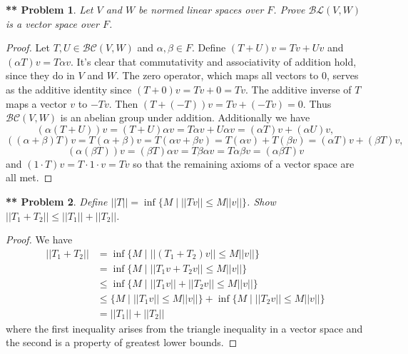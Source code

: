 \documentclass{article}
\newtheorem{**}{** Problem}
\begin{document}
\begin{flushleft}
\begin{**}
Let $V$ and $W$ be normed linear spaces over $F$. Prove $\mathcal{BL}(V, W)$ is a vector space over $F$.
\end{**}
\begin{proof}
Let $T, U \in \mathcal{BC} (V, W)$ and $\alpha, \beta \in F$. Define $(T + U)v = Tv + Uv$ and $(\alpha T)v = T\alpha v$. It's clear that commutativity and associativity of addition hold, since they do in $V$ and $W$. The zero operator, which maps all vectors to $0$, serves as the additive identity since $(T + 0)v = Tv + 0 = Tv$. The additive inverse of $T$ maps a vector $v$ to $-Tv$. Then $(T + (-T))v = Tv + (-Tv) = 0$. Thus $\mathcal{BC} (V, W)$ is an abelian group under addition. Additionally we have
\[
(\alpha(T + U))v = (T + U)\alpha v = T\alpha v + U\alpha v = (\alpha T)v + (\alpha U)v,
\]
\[
((\alpha + \beta)T)v = T(\alpha + \beta)v = T(\alpha v + \beta v) = T(\alpha v) + T(\beta v) = (\alpha T)v + (\beta T)v,
\]
\[
(\alpha(\beta T))v = (\beta T) \alpha v = T \beta \alpha v = T \alpha \beta v = (\alpha \beta T)v
\]
and $(1 \cdot T)v = T \cdot 1 \cdot v = Tv$ so that the remaining axioms of a vector space are all met.
\end{proof}

\begin{**}
Define $||T|| = \inf \{M \mid ||Tv|| \leq M||v||\}$. Show $||T_1 + T_2|| \leq ||T_1|| + ||T_2||$.
\end{**}
\begin{proof}
We have
\begin{align*}
||T_1 + T_2||
&= \inf \{M \mid ||(T_1 + T_2)v|| \leq M ||v||\}\\
&= \inf \{M \mid ||T_1v + T_2v|| \leq M ||v||\}\\
&\leq \inf \{M \mid ||T_1v|| + ||T_2v|| \leq M ||v||\}\\
&\leq \{M \mid ||T_1v|| \leq M ||v||\} + \inf \{M \mid ||T_2v|| \leq M ||v||\}\\
&= ||T_1|| + ||T_2||
\end{align*}
where the first inequality arises from the triangle inequality in a vector space and the second is a property of greatest lower bounds.
\end{proof}


\end{flushleft}
\end{document}
